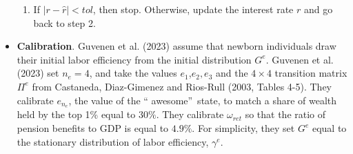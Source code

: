 \documentclass[12pt]{article}
\begin{document}
\begin{itemize}
\begin{enumerate}
\item If $\left\vert r-\widehat{r}\right\vert <tol$, then stop. Otherwise,
update the interest rate $r$ and go back to step 2.
\end{enumerate}

\item \textbf{Calibration}. Guvenen et al. (2023) assume that newborn
individuals draw their initial labor efficiency from the initial
distribution $G^{e}$. Guvenen et al. (2023) set $n_{e}=4$, and take the
values $e_{1}$,$e_{2},e_{3}$ and the $4\times 4$ transition matrix $\Pi ^{e}$
from Castaneda, Diaz-Gimenez and Rios-Rull (2003, Tables 4-5). They
calibrate $e_{n_{e}}$, the value of the \textquotedblleft
awesome\textquotedblright\ state, to match a share of wealth held by the top
1\% equal to $30\%$. They calibrate $\omega _{ret}$ so that the ratio of
pension benefits to GDP is equal to $4.9\%$. For simplicity, they set $G^{e}$
equal to the stationary distribution of labor efficiency, $\gamma ^{e}$.


\end{itemize}
\end{document}
